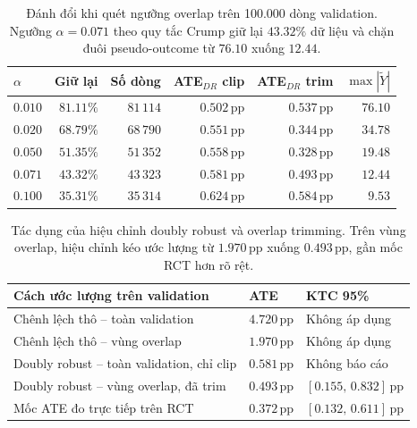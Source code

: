 \documentclass[11pt,a4paper]{article}
\newcommand{\pp}{\ensuremath{\,\text{pp}}}
\begin{document}
\begin{table}[H]
\centering
\scriptsize
\begin{tabular}{@{}lrrrrr@{}}
\toprule
$\alpha$ & \textbf{Giữ lại} & \textbf{Số dòng} &
\textbf{ATE$_{DR}$ clip} & \textbf{ATE$_{DR}$ trim} & $\max|\widetilde Y|$ \\
\midrule
$0.010$ & $81.11\%$ & $81\,114$ & $0.502\pp$ & $0.537\pp$ & $76.10$ \\
$0.020$ & $68.79\%$ & $68\,790$ & $0.551\pp$ & $0.344\pp$ & $34.78$ \\
$0.050$ & $51.35\%$ & $51\,352$ & $0.558\pp$ & $0.328\pp$ & $19.48$ \\
\textbf{$0.071$} & \textbf{$43.32\%$} & \textbf{$43\,323$} & \textbf{$0.581\pp$} & \textbf{$0.493\pp$} & \textbf{$12.44$} \\
$0.100$ & $35.31\%$ & $35\,314$ & $0.624\pp$ & $0.584\pp$ & $9.53$ \\
\bottomrule
\end{tabular}
\caption{Đánh đổi khi quét ngưỡng overlap trên 100.000 dòng validation.
Ngưỡng $\alpha=0.071$ theo quy tắc Crump giữ lại $43.32\%$ dữ liệu và chặn
đuôi pseudo-outcome từ $76.10$ xuống $12.44$.}
\label{tab:overlap-threshold}
\end{table}

\begin{table}[H]
\centering
\small
\begin{tabularx}{0.92\textwidth}{X
    >{\centering\arraybackslash}p{2.1cm}
    >{\centering\arraybackslash}p{3.2cm}}
\toprule
\textbf{Cách ước lượng trên validation} & \textbf{ATE} & \textbf{KTC 95\%} \\
\midrule
Chênh lệch thô -- toàn validation & $4.720\pp$ & Không áp dụng \\
Chênh lệch thô -- vùng overlap & $1.970\pp$ & Không áp dụng \\
Doubly robust -- toàn validation, chỉ clip & $0.581\pp$ & Không báo cáo \\
Doubly robust -- vùng overlap, đã trim & $0.493\pp$ & $[0.155,\,0.832]\pp$ \\
\midrule
Mốc ATE đo trực tiếp trên RCT & $0.372\pp$ & $[0.132,\,0.611]\pp$ \\
\bottomrule
\end{tabularx}
\caption{Tác dụng của hiệu chỉnh doubly robust và overlap trimming. Trên vùng
overlap, hiệu chỉnh kéo ước lượng từ $1.970\pp$ xuống $0.493\pp$, gần mốc
RCT hơn rõ rệt.}
\label{tab:dr-adjustment-ladder}
\end{table}
\end{document}
